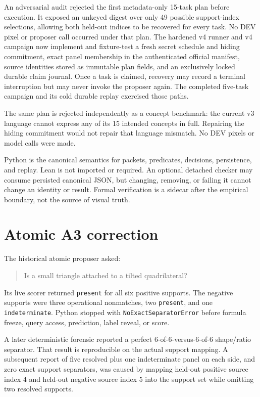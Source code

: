 \documentclass[11pt]{article}
\begin{document}
An adversarial audit rejected the first metadata-only 15-task plan before
execution.  It exposed an unkeyed digest over only 49 possible support-index
selections, allowing both held-out indices to be recovered for every task.
No DEV pixel or proposer call occurred under that plan.  The hardened v4
runner and v4 campaign now implement and fixture-test a fresh secret schedule
and hiding commitment, exact panel membership in the authenticated official
manifest, source identities stored as immutable plan fields, and an
exclusively locked durable claim journal.  Once a task is claimed, recovery
may record a terminal interruption but may never invoke the proposer again.
The completed five-task campaign and its cold durable replay exercised those
paths.

The same plan is rejected independently as a concept benchmark: the current
v3 language cannot express any of its 15 intended concepts in full.  Repairing
the hiding commitment would not repair that language mismatch.  No DEV pixels
or model calls were made.

Python is the canonical semantics for packets, predicates, decisions,
persistence, and replay.  Lean is not imported or required.  An optional
detached checker may consume persisted canonical JSON, but changing, removing,
or failing it cannot change an identity or result.  Formal verification is a
sidecar after the empirical boundary, not the source of visual truth.

\section{Atomic A3 correction}
\label{sec:a3-correction}

The historical atomic proposer asked:
\begin{quote}
Is a small triangle attached to a tilted quadrilateral?
\end{quote}
Its live scorer returned \texttt{present} for all six positive supports.  The
negative supports were three operational nonmatches, two \texttt{present}, and
one \texttt{indeterminate}.  Python stopped with
\texttt{NoExactSeparatorError} before formula freeze, query access,
prediction, label reveal, or score.

A later deterministic forensic reported a perfect 6-of-6-versus-6-of-6
shape/ratio separator.  That result is reproducible on the actual support
mapping.  A subsequent report of five resolved plus one indeterminate panel on
each side, and zero exact support separators, was caused by mapping held-out
positive source index 4 and held-out negative source index 5 into the support
set while omitting two resolved supports.
\end{document}
